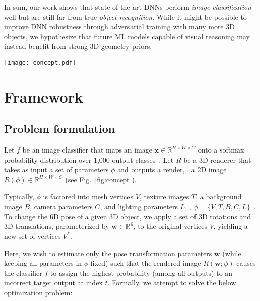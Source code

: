 \documentclass[10pt,twocolumn,letterpaper]{article}
\newcommand{\class}[1]{{\small\texttt{#1}}}
\newcommand{\x}{\mathbf{x}}
\newcommand{\w}{\mathbf{w}}
\newcommand{\R}{\mathbb{R}}
\begin{document}
In sum, our work shows that state-of-the-art DNNs perform \emph{image classification} well but are still far from true \emph{object recognition}.
While it might be possible to improve DNN robustness through adversarial training with many more 3D objects, we hypothesize that future ML models capable of visual reasoning may instead benefit from strong 3D geometry priors.

\begin{figure*}[t]
    \centering
    \texttt{[image: concept.pdf]}
    \caption{To test a target DNN, we build a 3D scene (a) that consists of 3D objects (here, a school bus and a pedestrian), lighting, a background scene, and camera parameters.
    Our 3D renderer renders the scene into a 2D image, which the image classifier labels \class{school bus}.
    We can estimate the pose changes of the school bus that cause the classifier to misclassify by (1) approximating gradients via finite differences; or (2) backpropagating (\textcolor{red_dashed_line}{red} dashed line) through a differentiable renderer.
    }\label{fig:concept}
\end{figure*}

\section{Framework}

\subsection{Problem formulation}

Let $f$ be an image classifier  that maps an image $\x \in \R^{H\times W\times C}$ onto a softmax probability distribution over 1,000 output classes~\cite{szegedy2016rethinking}.
Let $R$ be a 3D renderer that takes as input a set of parameters $\phi$ and outputs a render, \ie, a 2D image $R(\phi) \in \R^{H\times W\times C}$ (see Fig.~\ref{fig:concept}).

Typically, $\phi$ is factored into mesh vertices $V$, texture images $T$, a background image $B$, camera parameters $C$, and lighting parameters $L$, \ie, $\phi = \{V, T, B, C, L\}$~\cite{kato2018neural}.
To change the 6D pose of a given 3D object, we apply a set of 3D rotations and 3D translations, parameterized by $\w \in \R^6$, to the original vertices $V$, yielding a new set of vertices $V^*$.

Here, we wish to estimate only the pose transformation parameters $\w$ (while keeping all parameters in $\phi$ fixed) such that the rendered image $R(\w;\phi)$ causes the classifier $f$ to assign the highest probability (among all outputs) to an incorrect target output at index $t$.
Formally, we attempt to solve the below optimization problem:
\end{document}

